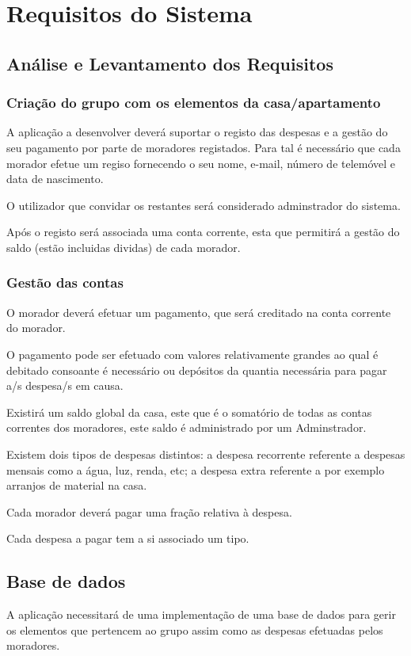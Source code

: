 \chapter{Requisitos do Sistema}

\section{Análise e Levantamento dos Requisitos}
\subsection{Criação do grupo com os elementos da casa/apartamento}
A aplicação a desenvolver deverá suportar o registo das despesas e a gestão do seu pagamento por parte de moradores registados. Para tal é necessário que cada morador efetue um regiso fornecendo o seu nome, e-mail, número de telemóvel e data de nascimento.

O utilizador que convidar os restantes será considerado adminstrador do sistema. 

Após o registo será associada uma conta corrente, esta que permitirá a gestão do saldo (estão incluidas dividas) de cada morador. 


\subsection{Gestão das contas}
 O morador deverá efetuar um pagamento, que será creditado na conta corrente do morador. 
 
 O pagamento pode ser efetuado com valores relativamente grandes ao qual é debitado consoante é necessário ou depósitos da quantia necessária para pagar a/s despesa/s em causa. 
 
 Existirá um saldo global da casa, este que é o somatório de todas as contas correntes dos moradores, este saldo é administrado por um Adminstrador. 
 
 Existem dois tipos de despesas distintos: a despesa recorrente referente a despesas mensais como a água, luz, renda, etc; 
 a despesa extra referente a por exemplo arranjos de material na casa. 
 
 Cada morador deverá pagar uma fração relativa à despesa. 
 
 Cada despesa a pagar tem a si associado um tipo. 
 
 

\section{Base de dados }
A aplicação necessitará de uma implementação de uma base de dados para gerir os elementos que pertencem ao grupo assim como as despesas efetuadas pelos moradores. 

